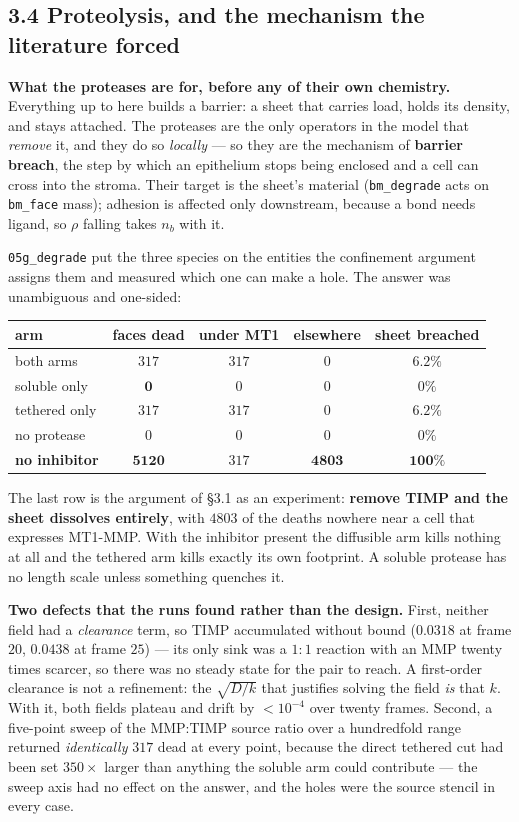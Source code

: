 \documentclass[10pt,a4paper]{article}
\newcommand{\code}[1]{\texttt{#1}}
\newcommand{\op}[1]{\texttt{#1}}
\begin{document}
\subsection*{3.4\; Proteolysis, and the mechanism the literature forced}

\textbf{What the proteases are for, before any of their own chemistry.} Everything up to
here builds a barrier: a sheet that carries load, holds its density, and stays attached. The proteases
are the only operators in the model that \emph{remove} it, and they do so \emph{locally} --- so they
are the mechanism of \textbf{barrier breach}, the step by which an epithelium stops being enclosed and
a cell can cross into the stroma. Their target is the sheet's material (\op{bm\_degrade} acts on
\code{bm\_face} mass); adhesion is affected only downstream, because a bond needs ligand, so $\rho$
falling takes $n_b$ with it.



\op{05g\_degrade} put the three species on the entities the confinement argument assigns them and
measured which one can make a hole. The answer was unambiguous and one-sided:

\smallskip
{\footnotesize
\begin{tabular}{@{}lcccc@{}}\toprule
arm & faces dead & under MT1 & elsewhere & sheet breached\\\midrule
both arms      & $317$  & $317$ & $0$    & $6.2\%$\\
soluble only   & $\mathbf 0$ & $0$ & $0$ & $0\%$\\
tethered only  & $317$  & $317$ & $0$    & $6.2\%$\\
no protease    & $0$    & $0$   & $0$    & $0\%$\\
\textbf{no inhibitor} & $\mathbf{5120}$ & $317$ & $\mathbf{4803}$ & $\mathbf{100\%}$\\
\bottomrule\end{tabular}}
\smallskip

The last row is the argument of \S3.1 as an experiment: \textbf{remove TIMP and the sheet dissolves
entirely}, with $4803$ of the deaths nowhere near a cell that expresses MT1-MMP. With the inhibitor
present the diffusible arm kills nothing at all and the tethered arm kills exactly its own footprint.
A soluble protease has no length scale unless something quenches it.

\textbf{Two defects that the runs found rather than the design.} First, neither field had a
\emph{clearance} term, so TIMP accumulated without bound ($0.0318$ at frame $20$, $0.0438$ at frame
$25$) --- its only sink was a $1{:}1$ reaction with an MMP twenty times scarcer, so there was no steady
state for the pair to reach. A first-order clearance is not a refinement: the $\sqrt{D/k}$ that
justifies solving the field \emph{is} that $k$. With it, both fields plateau and drift by
$<10^{-4}$ over twenty frames. Second, a five-point sweep of the MMP:TIMP source ratio over a
hundredfold range returned \emph{identically} $317$ dead at every point, because the direct tethered
cut had been set $350\times$ larger than anything the soluble arm could contribute --- the sweep axis
had no effect on the answer, and the holes were the source stencil in every case.
\end{document}
